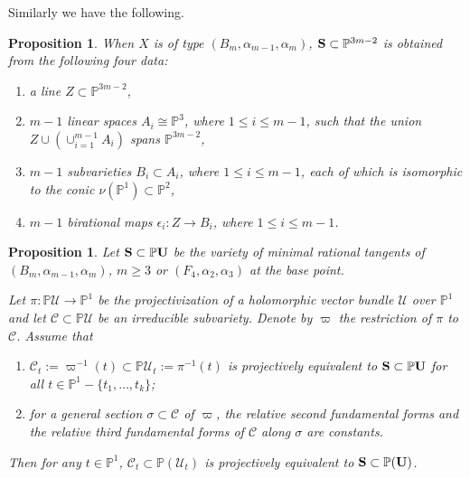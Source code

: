 \documentclass[12pt]{amsart}
\theoremstyle{plain}
\newtheorem{proposition}[theorem]{Proposition}
\theoremstyle{definition}
\begin{document}
Similarly we have the following.

\begin{proposition} \label{characterization of vmrt B}  When $X$ is of type $(B_m, \alpha_{m-1}, \alpha_m)$,
 ${\bf S} \subset \mathbb P^{ 3m-2}$ is obtained from the following four data:
   \begin{enumerate}
\item[(i)] a line $Z \subset \mathbb P^{3m-2}$,
\item[(ii)] $m-1$ linear spaces $A_i \cong \mathbb P^3$, where $1 \leq i \leq m-1$, such that the union $Z \cup \left(\cup_{i=1}^{m-1} A_i\right) $ spans $ \mathbb P^{3m-2}$,
\item[(iii)] $m-1$ subvarieties $B_i \subset A_i$, where $1 \leq i \leq m-1$, each of   which is  isomorphic to the conic $\nu(\mathbb P^1) \subset \mathbb P^2$,
\item[(iv)] $m-1$ birational maps $\epsilon_i \colon Z \rightarrow B_i$, where $1 \leq i \leq m-1$.
   \end{enumerate}
\end{proposition}


\begin{proposition} \label{parallel transport of vmrt}
Let ${\bf S} \subset \mathbb P {\bf U} $ be the variety of minimal rational tangents of
$(B_m, \alpha_{m-1}, \alpha_{m})$, $m \geq 3$ or $(F_4, \alpha_2, \alpha_3)$ at the base point.


  Let $\pi: \mathbb P \mathcal U\rightarrow \mathbb P^1$ be the projectivization of a holomorphic vector bundle $\mathcal U$ over  $  \mathbb P^1$  and let $\mathcal C \subset \mathbb P \mathcal U$ be an irreducible subvariety. Denote by $\varpi$ the restriction of $\pi$ to $\mathcal C$. Assume that
   \begin{enumerate}
   \item $\mathcal C_t:=\varpi^{-1}(t) \subset \mathbb P  \mathcal U_t:=\pi^{-1}(t)$ is projectively equivalent to ${\bf S} \subset \mathbb P {\bf U}$ for all $t \in \mathbb P^1 -\{t_1, \dots, t_k\}$; %
  \item
      for  a general  section $\sigma \subset \mathcal C$ of $\varpi$, the relative second fundamental forms and the relative third fundamental forms of $\mathcal C$ along $\sigma$ are constants.
     \end{enumerate}

Then for any $t \in \mathbb P^1$, $\mathcal C_t \subset \mathbb P(\mathcal U_t)$ is projectively equivalent  to ${\bf S} \subset \mathbb P({\bf U})$.
\end{proposition}
\end{document}
